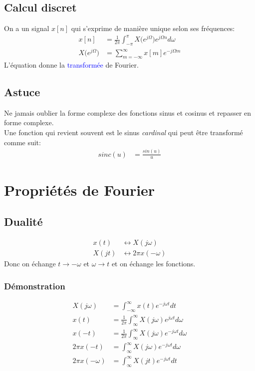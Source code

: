 \documentclass{report}
\begin{document}
\subsection{Calcul discret}
On a un signal $x[n]$ qui s'exprime de manière unique selon ses fréquences:
\begin{align}
x[n] &= \frac{1}{2\pi}\int_{-\pi}^{\pi} X \bigl(e^{j\Omega} \bigl) e^{j\Omega n} d\omega\\
X\bigl(e^{j\Omega} \bigl) &= \sum_{m=-\infty}^{\infty} x[m]e^{-j\Omega m} \label{eq:transfoDF}
\end{align}
L'équation \label{eq:transfoDF} donne la \textcolor{blue}{transformée} de Fourier.

\subsection{Astuce}
Ne jamais oublier la forme complexe des fonctions sinus et cosinus et repasser en forme complexe.\\
Une fonction qui revient souvent est le sinus \textit{cardinal} qui peut être transformé comme suit:
\begin{align*}
sinc(u) &= \frac{sin( u)}{ u}
\end{align*}

\section{Propriétés de Fourier} \label{proprF}

\subsection{Dualité} \label{Dua}
\begin{align}
x(t) & \longleftrightarrow X(j\omega)\\
X(jt) & \longleftrightarrow 2\pi x(-\omega)
\end{align}
Donc on échange $t \rightarrow -\omega$ et $\omega \rightarrow t$ et on échange les fonctions.
\subsubsection{Démonstration}
\begin{align*}
X(j \omega) &= \int_{-\infty}^{\infty} x(t) e^{-j\omega t} dt\\
x(t) &= \frac{1}{2\pi} \int_{\infty}^{\infty} X(j\omega) e^{j\omega t} d\omega\\
x(-t) &= \frac{1}{2\pi} \int_{\infty}^{\infty} X(j\omega) e^{-j\omega t} d\omega\\
2 \pi x(-t) &= \int_{\infty}^{\infty} X(j\omega) e^{-j\omega t} d\omega\\
2 \pi x(-\omega) &= \int_{\infty}^{\infty} X(jt) e^{-j\omega t} dt
\end{align*}
\end{document}
